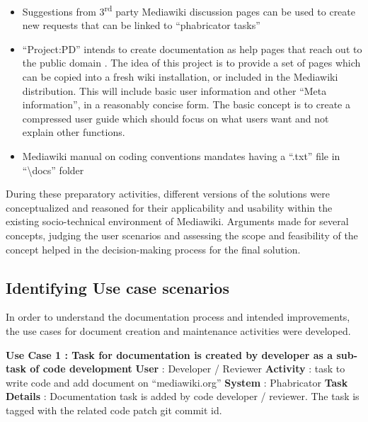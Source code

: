 \begin{enumerate}
\begin{itemize}
\item Suggestions from 3\textsuperscript{rd} party Mediawiki discussion pages can be used to create new requests that can be linked to \enquote{phabricator tasks} \cite{3P_users}
\item \enquote{Project:PD} intends to create documentation as help pages that reach out to the public domain \cite{Project_pd}.
\indent The idea of this project is to provide a set of pages which can be copied into a fresh wiki installation, or included in the Mediawiki distribution. This will include basic user information and other \enquote{Meta information}, in a reasonably concise form. The basic concept is to create a compressed user guide which should focus on what users want and not explain other functions.
\item Mediawiki manual on coding conventions mandates having a \enquote{.txt} file in \enquote{\textbackslash{docs}} folder \cite{manual_cc}

\end{itemize}
\end{enumerate}

During these preparatory activities, different versions of the solutions were conceptualized and reasoned for their applicability and usability within the existing socio-technical environment of Mediawiki.
Arguments made for several concepts, judging the user scenarios and assessing the scope and feasibility of the concept helped in the decision-making process for the final solution.


\subsection{Identifying Use case scenarios }
In order to understand the documentation process and intended improvements, the use cases for document creation and maintenance activities were developed.
\newline \newline
\begin{mdframed}[leftmargin=10pt,rightmargin=10pt]
\textbf{Use Case 1 : Task for documentation is created by developer as a sub-task of code development}
\newline\newline \indent \textbf{User} : Developer / Reviewer
\newline \newline \indent \textbf{Activity} : task to write code and add document on \enquote{mediawiki.org}
\newline \newline \indent \textbf{System} : Phabricator
\newline \newline \indent \textbf{Task Details} : Documentation task is added by code developer / reviewer. The task is tagged with the related code patch git commit id.
\end{mdframed}

